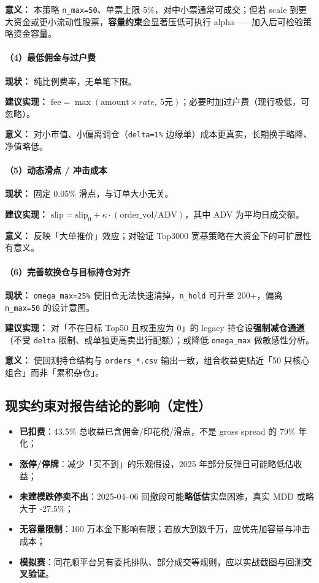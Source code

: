 \documentclass[UTF8,a4paper,12pt]{ctexart}
\begin{document}
\textbf{意义：} 本策略 \texttt{n\_max=50}、单票上限 5\%，对中小票通常可成交；但若 scale 到更大资金或更小流动性股票，\textbf{容量约束}会显著压低可执行 alpha——加入后可检验策略资金容量。

\paragraph{（4）最低佣金与过户费}

\textbf{现状：} 纯比例费率，无单笔下限。

\textbf{建议实现：} $\text{fee}=\max(\text{amount}\times rate,\ 5\text{元})$；必要时加过户费（现行极低，可忽略）。

\textbf{意义：} 对小市值、小偏离调仓（\texttt{delta=1\%} 边缘单）成本更真实，长期换手略降、净值略低。

\paragraph{（5）动态滑点 / 冲击成本}

\textbf{现状：} 固定 0.05\% 滑点，与订单大小无关。

\textbf{建议实现：} $\mathrm{slip}=\mathrm{slip}_0+\kappa\cdot(\mathrm{order\_vol}/\mathrm{ADV})$，其中 ADV 为平均日成交额。

\textbf{意义：} 反映「大单推价」效应；对验证 Top3000 宽基策略在大资金下的可扩展性有意义。

\paragraph{（6）完善软换仓与目标持仓对齐}

\textbf{现状：} \texttt{omega\_max=25\%} 使旧仓无法快速清掉，\texttt{n\_hold} 可升至 200+，偏离 \texttt{n\_max=50} 的设计意图。

\textbf{建议实现：} 对「不在目标 Top50 且权重应为 0」的 legacy 持仓设\textbf{强制减仓通道}（不受 \texttt{delta} 限制、或单独更高卖出行配额）；或降低 \texttt{omega\_max} 做敏感性分析。

\textbf{意义：} 使回测持仓结构与 \texttt{orders\_*.csv} 输出一致，组合收益更贴近「50 只核心组合」而非「累积杂仓」。

\subsection{现实约束对报告结论的影响（定性）}

\begin{itemize}[leftmargin=2em]
  \item \textbf{已扣费}：43.5\% 总收益已含佣金/印花税/滑点，不是 gross spread 的 79\% 年化；
  \item \textbf{涨停/停牌}：减少「买不到」的乐观假设，2025 年部分反弹日可能略低估收益；
  \item \textbf{未建模跌停卖不出}：2025-04--06 回撤段可能\textbf{略低估}实盘困难，真实 MDD 或略大于 -27.5\%；
  \item \textbf{无容量限制}：100 万本金下影响有限；若放大到数千万，应优先加容量与冲击成本；
  \item \textbf{模拟赛}：同花顺平台另有委托排队、部分成交等规则，应以实战截图与回测\textbf{交叉验证}。
\end{itemize}
\end{document}
